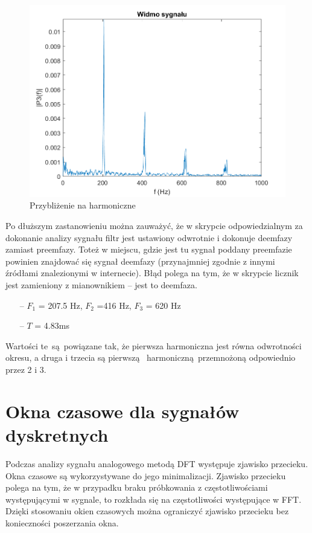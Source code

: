 \documentclass[a4paper, 12pt, titlepage]{article}
\begin{document}
        \begin{figure}[H]
            \centering
            \includegraphics[width=0.8\linewidth]{FFT_2.png}
            \caption{Przybliżenie na harmoniczne}
        \end{figure}
        Po dłuższym zastanowieniu można zauważyć, że w skrypcie
        odpowiedzialnym za dokonanie analizy sygnału filtr jest
        ustawiony odwrotnie i dokonuje deemfazy zamiast preemfazy.
        Toteż w miejscu, gdzie jest tu sygnał poddany preemfazie 
        powinien znajdować się sygnał deemfazy (przynajmniej
        zgodnie z innymi źródłami znalezionymi w internecie).
        Błąd polega na tym, że w skrypcie licznik jest zamieniony
        z mianownikiem -- jest to deemfaza.
        \begin{itemize}
            \item[--] $F_1$ = 207.5 Hz, $F_2$ =416 Hz, $F_3$ = 620 Hz
            \item[--] $T$ = 4.83ms
        \end{itemize}
        Wartości te są powiązane tak, że pierwsza harmoniczna jest
        równa odwrotności okresu, a druga i trzecia są pierwszą 
        harmoniczną przemnożoną odpowiednio przez 2 i 3.
    \section{Okna czasowe dla sygnałów dyskretnych}
        Podczas analizy sygnału analogowego metodą DFT występuje zjawisko
        przecieku. Okna czasowe są wykorzystywane do jego minimalizacji.
        Zjawisko przecieku polega na tym, że w przypadku braku próbkowania
        z częstotliwościami występującymi w sygnale, to rozkłada się na
        częstotliwości występujące w FFT. Dzięki stosowaniu okien czasowych
        można ograniczyć zjawisko przecieku bez konieczności poszerzania okna.
\end{document}
